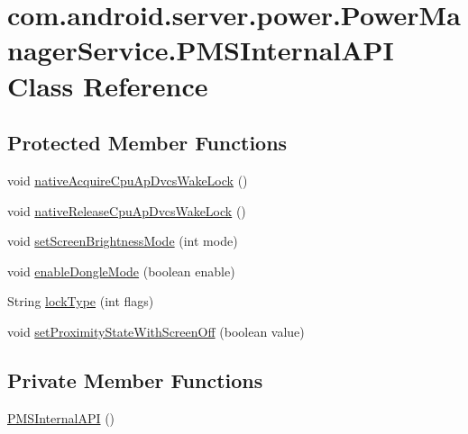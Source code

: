 \hypertarget{classcom_1_1android_1_1server_1_1power_1_1PowerManagerService_1_1PMSInternalAPI}{\section{com.\-android.\-server.\-power.\-Power\-Manager\-Service.\-P\-M\-S\-Internal\-A\-P\-I Class Reference}
\label{classcom_1_1android_1_1server_1_1power_1_1PowerManagerService_1_1PMSInternalAPI}
}
\subsection*{Protected Member Functions}
\begin{DoxyCompactItemize}
\item 
void \hyperlink{classcom_1_1android_1_1server_1_1power_1_1PowerManagerService_1_1PMSInternalAPI_a2c21275390cd8f2b1f53cb6dd06c4877}{native\-Acquire\-Cpu\-Ap\-Dvcs\-Wake\-Lock} ()
\item 
void \hyperlink{classcom_1_1android_1_1server_1_1power_1_1PowerManagerService_1_1PMSInternalAPI_a4db20b5e9bfaa426031e83aa002d7b6e}{native\-Release\-Cpu\-Ap\-Dvcs\-Wake\-Lock} ()
\item 
void \hyperlink{classcom_1_1android_1_1server_1_1power_1_1PowerManagerService_1_1PMSInternalAPI_ae1761f4708d628f8f314c61b116c44eb}{set\-Screen\-Brightness\-Mode} (int mode)
\item 
void \hyperlink{classcom_1_1android_1_1server_1_1power_1_1PowerManagerService_1_1PMSInternalAPI_ad786fda0ee177bb56ab41a7d614a1780}{enable\-Dongle\-Mode} (boolean enable)
\item 
String \hyperlink{classcom_1_1android_1_1server_1_1power_1_1PowerManagerService_1_1PMSInternalAPI_aafa8d831439d29a684267d60c946bd10}{lock\-Type} (int flags)
\item 
void \hyperlink{classcom_1_1android_1_1server_1_1power_1_1PowerManagerService_1_1PMSInternalAPI_a8ac36d918efb5363603b8f1af9558902}{set\-Proximity\-State\-With\-Screen\-Off} (boolean value)
\end{DoxyCompactItemize}
\subsection*{Private Member Functions}
\begin{DoxyCompactItemize}
\item 
\hyperlink{classcom_1_1android_1_1server_1_1power_1_1PowerManagerService_1_1PMSInternalAPI_aaa5c9f5b6d38020de0ea61de3db0f82a}{P\-M\-S\-Internal\-A\-P\-I} ()
\end{DoxyCompactItemize}


